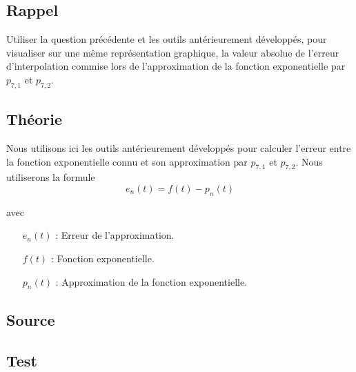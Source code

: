 \documentclass[a4paper,10pt]{report}
\begin{document}
\subsection*{Rappel}
Utiliser la question précédente et les outils antérieurement développés, pour
visualiser sur une même représentation graphique, la valeur absolue de l’erreur
d’interpolation commise lors de l’approximation de la fonction exponentielle
par $p_{7,1}$ et $p_{7,2}$.


\subsection*{Théorie}
Nous utilisons ici les outils antérieurement développés pour calculer l'erreur entre la fonction exponentielle connu et son approximation par $p_{7,1}$ et $p_{7,2}$.
Nous utiliserons la formule
\begin{equation}
	e_{n}(t) = f(t) - p_{n}(t)
\end{equation}

avec

\begin{list}{}{}
\item
\begin{itemize}
	\item[$e_{n}(t)$]: Erreur de l'approximation.
	\item[$f(t)$]: Fonction exponentielle.
	\item[$p_{n}(t)$]: Approximation de la fonction exponentielle.
\end{itemize}
\end{list}

\subsection*{Source}
\begin{center}
%	
\end{center}

\subsection*{Test}

\begin{center}
\end{center}

\begin{center}
\end{center}
\end{document}
